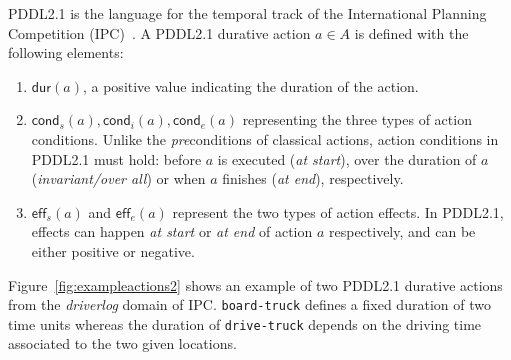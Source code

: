 \documentclass{ecai}
\newcommand{\eff}{\mathsf{eff}}    %
\newcommand{\cond}{\mathsf{cond}}  %
\newcommand{\dur}{\mathsf{dur}}    %
\newcommand{\start}{\mathsf{start}}%
\newcommand{\en}{\mathsf{end}}     %
\begin{document}
PDDL2.1 is the language for the temporal track of the International Planning Competition (IPC)~\cite{fox2003pddl2,ghallab2004automated}. A PDDL2.1 durative action $a\in A$ is defined with the following elements:

\begin{enumerate}
\item $\dur(a)$, a positive value indicating the duration of the action.

\item $\cond_s(a), \cond_i(a), \cond_e(a)$ representing the three types of action conditions. Unlike the \emph{pre}conditions of classical actions, action conditions in PDDL2.1 must hold: before $a$ is executed ({\em at start}), over the duration of $a$ (\textit{invariant/over all}) or when $a$ finishes ({\em at end}), respectively. 

\item $\eff_s(a)$ and $\eff_e(a)$ represent the two types of action effects. In PDDL2.1, effects can happen {\em at start} or {\em at end} of action $a$ respectively, and can be either positive or negative. %

\end{enumerate}


Figure~\ref{fig:exampleactions2} shows an example of two PDDL2.1 durative actions from the {\em driverlog} domain of IPC.  \texttt{board-truck} defines a fixed duration of two time units whereas the duration of \texttt{drive-truck} depends on the driving time associated to the two given locations.
\end{document}
